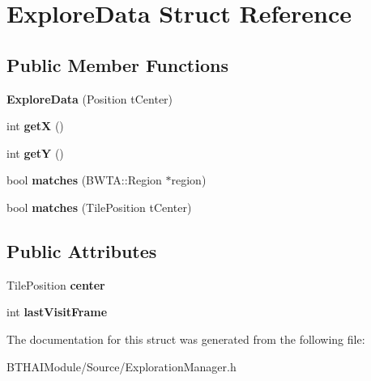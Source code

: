 \hypertarget{struct_explore_data}{\section{Explore\-Data Struct Reference}
\label{struct_explore_data}
}
\subsection*{Public Member Functions}
\begin{DoxyCompactItemize}
\item 
\hypertarget{struct_explore_data_a2d40229de367149073512796cd1846be}{{\bfseries Explore\-Data} (Position t\-Center)}\label{struct_explore_data_a2d40229de367149073512796cd1846be}

\item 
\hypertarget{struct_explore_data_af76de70f93c5d115dfe95ce1a27f7adc}{int {\bfseries get\-X} ()}\label{struct_explore_data_af76de70f93c5d115dfe95ce1a27f7adc}

\item 
\hypertarget{struct_explore_data_a6778868b5a691aefe1df82de9ac0dc68}{int {\bfseries get\-Y} ()}\label{struct_explore_data_a6778868b5a691aefe1df82de9ac0dc68}

\item 
\hypertarget{struct_explore_data_a47b4beb2aee1112ddf588148d0f47e6e}{bool {\bfseries matches} (B\-W\-T\-A\-::\-Region $\ast$region)}\label{struct_explore_data_a47b4beb2aee1112ddf588148d0f47e6e}

\item 
\hypertarget{struct_explore_data_ac4b1a5d1d8fdcb929b7074f12aeb4513}{bool {\bfseries matches} (Tile\-Position t\-Center)}\label{struct_explore_data_ac4b1a5d1d8fdcb929b7074f12aeb4513}

\end{DoxyCompactItemize}
\subsection*{Public Attributes}
\begin{DoxyCompactItemize}
\item 
\hypertarget{struct_explore_data_aab68c0b670029338864b056907366d3b}{Tile\-Position {\bfseries center}}\label{struct_explore_data_aab68c0b670029338864b056907366d3b}

\item 
\hypertarget{struct_explore_data_a09f7310b7bbaf04e1b13d6ea946ec74f}{int {\bfseries last\-Visit\-Frame}}\label{struct_explore_data_a09f7310b7bbaf04e1b13d6ea946ec74f}

\end{DoxyCompactItemize}


The documentation for this struct was generated from the following file\-:\begin{DoxyCompactItemize}
\item 
B\-T\-H\-A\-I\-Module/\-Source/Exploration\-Manager.\-h\end{DoxyCompactItemize}
